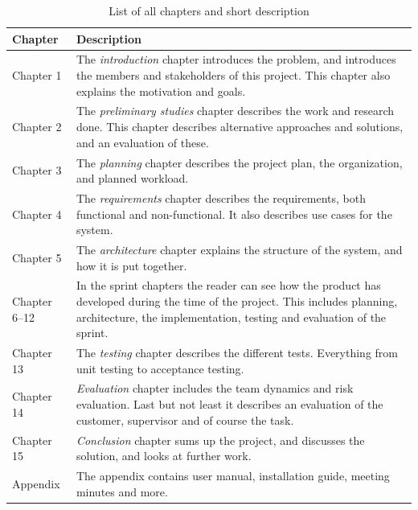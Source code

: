 \begin{table}[!htbp]\centering
\caption{List of all chapters and short description}
\label{tab:structure_of_report}
\def\arraystretch{1.3}
\begin{tabularx}{\textwidth}{lX} \toprule[0.5mm]
\textbf{Chapter} & \textbf{Description} \\ \midrule
Chapter 1 & The \emph{introduction} chapter introduces the problem, and introduces the members and stakeholders of this project.
This chapter also explains the motivation and goals. \\

Chapter 2 &  The \emph{preliminary studies} chapter describes the work and research done. This chapter describes alternative approaches and solutions, and an evaluation of these. \\

Chapter 3 &  The \emph{planning} chapter describes the project plan, the organization, and planned workload.  \\

Chapter 4 &  The \emph{requirements} chapter describes the requirements, both functional and non-functional. It also describes use cases for the system. \\

Chapter 5	 &  The \emph{architecture} chapter explains the structure of the system, and how it is put together. \\

Chapter 6--12 	&  In the sprint chapters the reader can see how the product has developed during the time of the project. This includes planning, architecture, the implementation, testing and evaluation of the sprint. \\

Chapter 13 	 &  The \emph{testing} chapter describes the different tests. Everything from unit testing to acceptance testing. \\

Chapter 14 	 &  \emph{Evaluation} chapter includes the team dynamics and risk evaluation. Last but not least it describes an evaluation of the customer, supervisor and of course the task. \\

Chapter 15 	 &  \emph{Conclusion} chapter sums up the project, and discusses the solution, and looks at further work. \\

\midrule
Appendix 	 &   The appendix contains user manual, installation guide, meeting minutes and more.\\

\bottomrule[0.5mm]
\end{tabularx}
\end{table}



